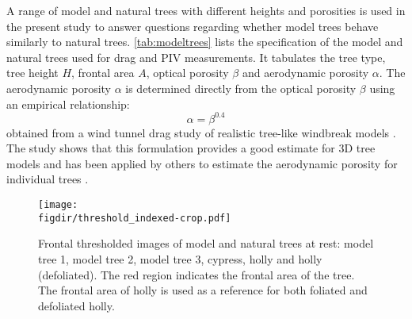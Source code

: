 A range of model and natural trees with different heights and porosities is used in the present study to answer questions regarding whether model trees behave similarly to natural trees. \cref{tab:modeltrees} lists the specification of the model and natural trees used for drag and PIV measurements. It tabulates the tree type, tree height $H$, frontal area $A$, optical porosity $\beta$ and aerodynamic porosity $\alpha$. The aerodynamic porosity $\alpha$ is determined directly from the optical porosity $\beta$ using an empirical relationship:
\begin{equation}
\alpha = \beta^{0.4}
\label{eq:aerodynamicporosity}
\end{equation}
obtained from a wind tunnel drag study of realistic tree-like windbreak models \citep{Guan2003}. The study shows that this formulation provides a good estimate for 3D tree models and has been applied by others to estimate the aerodynamic porosity for individual trees \citep{Bitog2011b,Lee2014565,Rosenfeld2010}.

	\begin{figure}[t]
	\centering
	\texttt{[image: \\figdir/threshold\_indexed-crop.pdf]}
	\caption{Frontal thresholded images of model and natural trees at rest:  model tree 1,  model tree 2,  model tree 3,  cypress,  holly and  holly (defoliated). The red region indicates the frontal area of the tree. The frontal area of holly is used as a reference for both foliated and defoliated holly.}
	\label{fig:thresholdindexed}
	\end{figure}

